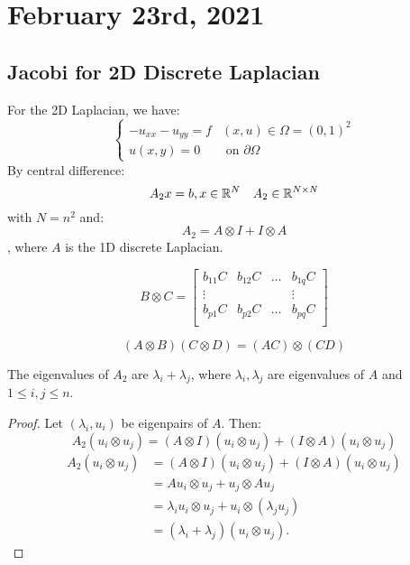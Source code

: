 \documentclass[../main/main.tex]{subfiles}
\begin{document}
\section{February 23rd, 2021}
\subsection{Jacobi for 2D Discrete Laplacian}
For the 2D Laplacian, we have: \[
  \begin{cases}
    -u_{x x }-u_{y y} = f & (x,u) \in\Omega = (0,1)^2 \\
    u(x,y) = 0 & \text{ on }\partial \Omega
  \end{cases}
\] By central difference: \[
A_{2} x = b, x \in\mathbb{R}^{N} \quad A_{2} \in\mathbb{R}^{N \times N}
\] with $N = n^2$ and: \[
  A_{2}= A\otimes I + I\otimes A
\], where $A$ is the 1D discrete Laplacian.
\begin{definition}
  \[
B\otimes C = \begin{bmatrix}
b_{11} C & b_{12} C & \ldots & b_{1q}C \\
\vdots & & & \vdots\\
b_{p1} C & b_{p2} C & \ldots & b_{pq}C \\
\end{bmatrix}  \]
\end{definition}
\begin{theorem}
  \[
    (A\otimes B)(C\otimes D) = (AC) \otimes (CD)
  \]
\end{theorem}
\begin{lemma}
The eigenvalues of $A_2$ are $\lambda_{i}+\lambda_{j}$, where $\lambda_{i},\lambda_{j}$ are eigenvalues of $A$ and $1\leq i,j \leq n$.
\end{lemma}
\begin{proof}
  Let $(\lambda_{i},u_{i})$ be eigenpairs of $A$. Then: \[
A_{2}(u_{i}\otimes u_{j}) = (A\otimes I)(u_{i}\otimes u_{j}) + (I \otimes A) (u_{i}\otimes u_{j})
\]
\begin{align*}
  A_{2}(u_{i}\otimes u_{j}) &= (A\otimes I)(u_{i}\otimes u_{j}) + (I \otimes A) (u_{i}\otimes u_{j}) \\
                            &= Au_{i} \otimes u_{j} + u_{j} \otimes Au_{j} \\
                            &=\lambda_{i} u_{i} \otimes u_{j} + u_{i}\otimes (\lambda_{j}u_{j}) \\
  &= (\lambda_{i}+\lambda_{j}) (u_{i}\otimes u_{j})
  .\end{align*}
\end{proof}
\end{document}
